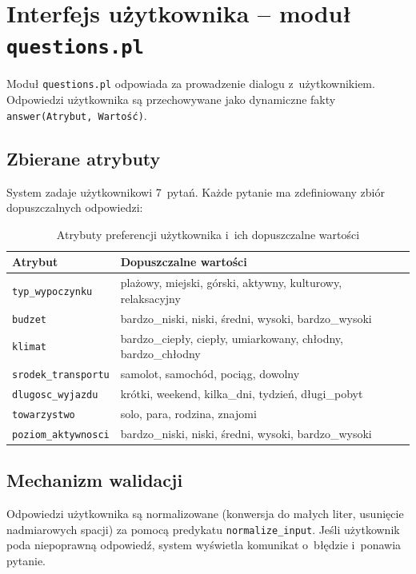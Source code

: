 \documentclass[12pt,a4paper]{article}
\begin{document}
\section{Interfejs użytkownika -- moduł \texttt{questions.pl}}

Moduł \texttt{questions.pl} odpowiada za prowadzenie dialogu z~użytkownikiem. Odpowiedzi użytkownika są przechowywane jako dynamiczne fakty \texttt{answer(Atrybut, Wartość)}.

\subsection{Zbierane atrybuty}

System zadaje użytkownikowi 7~pytań. Każde pytanie ma zdefiniowany zbiór dopuszczalnych odpowiedzi:

\begin{table}[H]
\centering
\small
\begin{tabularx}{\textwidth}{lX}
\toprule
\textbf{Atrybut} & \textbf{Dopuszczalne wartości} \\
\midrule
\texttt{typ\_wypoczynku} & plażowy, miejski, górski, aktywny, kulturowy, relaksacyjny \\
\texttt{budzet} & bardzo\_niski, niski, średni, wysoki, bardzo\_wysoki \\
\texttt{klimat} & bardzo\_ciepły, ciepły, umiarkowany, chłodny, bardzo\_chłodny \\
\texttt{srodek\_transportu} & samolot, samochód, pociąg, dowolny \\
\texttt{dlugosc\_wyjazdu} & krótki, weekend, kilka\_dni, tydzień, długi\_pobyt \\
\texttt{towarzystwo} & solo, para, rodzina, znajomi \\
\texttt{poziom\_aktywnosci} & bardzo\_niski, niski, średni, wysoki, bardzo\_wysoki \\
\bottomrule
\end{tabularx}
\caption{Atrybuty preferencji użytkownika i~ich dopuszczalne wartości}
\end{table}

\subsection{Mechanizm walidacji}

Odpowiedzi użytkownika są normalizowane (konwersja do małych liter, usunięcie nadmiarowych spacji) za pomocą predykatu \texttt{normalize\_input}. Jeśli użytkownik poda niepoprawną odpowiedź, system wyświetla komunikat o~błędzie i~ponawia pytanie.
\end{document}
